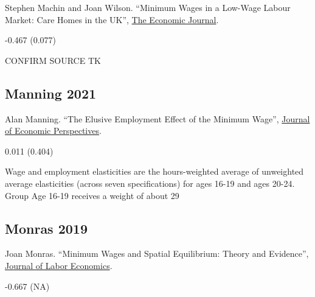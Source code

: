 \noindent Stephen Machin and Joan Wilson. ``Minimum Wages in a Low-Wage Labour Market: Care Homes in the UK'', \href{https://doi.org/10.1111/j.0013-0133.2003.00199.x}{The Economic Journal}.

\vspace{0.7em}

 -0.467 (0.077)

\vspace{0.7em}

 CONFIRM SOURCE TK

\subsection*{Manning 2021}
\vspace{-0.7em}

\noindent Alan Manning. ``The Elusive Employment Effect of the Minimum Wage'', \href{https://doi.org/10.1257/jep.35.1.3}{Journal of Economic Perspectives}.

\vspace{0.7em}

 0.011 (0.404)

\vspace{0.7em}

 Wage and employment elasticities are the hours-weighted average of unweighted average elasticities (across seven specifications) for ages 16-19 and ages 20-24. Group Age 16-19 receives a weight of about 29%

\subsection*{Monras 2019}
\vspace{-0.7em}

\noindent Joan Monras. ``Minimum Wages and Spatial Equilibrium: Theory and Evidence'', \href{https://doi.org/10.1086/702650}{Journal of Labor Economics}.

\vspace{0.7em}

 -0.667 (NA)

